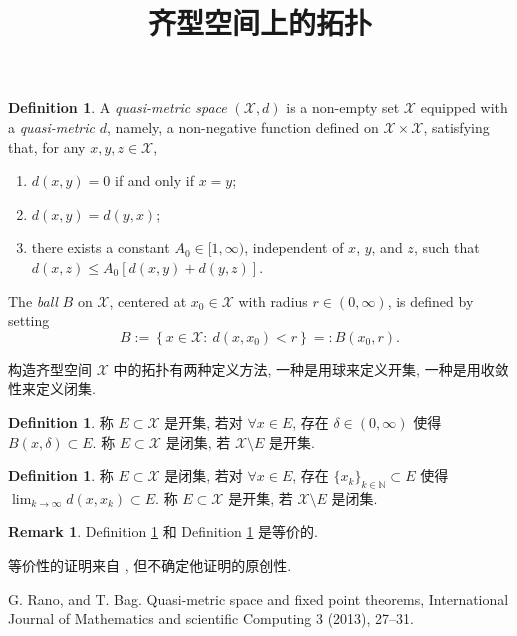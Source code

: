 \documentclass[a4paper,11pt]{article}
\title{齐型空间上的拓扑}
\theoremstyle{definition}
\newtheorem{remark}[theorem]{Remark}
\newtheorem{definition}[theorem]{Definition}
\begin{document}
\begin{CJK*}{UTF8}{gbsn}

\maketitle

\begin{definition} \label{10.21.1}
A \emph{quasi-metric space} $ (\mathcal{X}, d) $ is a non-empty set $ \mathcal{X} $ equipped with a \emph{quasi-metric} $ d $,
namely, a non-negative function defined on $ \mathcal{X} \times \mathcal{X} $, satisfying that, for any $ x, y, z \in \mathcal{X} $,
    \begin{enumerate}[{\rm(i)}]
        \item $ d(x, y) = 0 $ if and only if $ x = y $;
        \item $ d(x, y) = d(y, x) $;
        \item there exists a constant $ A_0 \in [1, \infty) $, independent of $ x $, $ y $,
            and $ z $, such that $ d(x, z) \leq A_0 [d(x, y) + d(y, z)] $.
    \end{enumerate}
\end{definition}

The \emph{ball} $ B $ on $ \mathcal{X} $, centered at $ x_0 \in \mathcal{X} $ with radius $ r \in (0, \infty) $, 
is defined by setting
$$
    B := \left\{x \in \mathcal{X} :\ d(x, x_0) < r \right\} =: B \left( x_0, r \right).
$$

构造齐型空间 $ \mathcal{X} $ 中的拓扑有两种定义方法, 一种是用球来定义开集, 一种是用收敛性来定义闭集.

\begin{definition} \label{def1}
    称 $ E \subset \mathcal{X} $ 是开集, 若对 $ \forall x \in E $, 
    存在 $ \delta \in (0, \infty) $ 使得 $ B(x, \delta) \subset E $.
    称 $ E \subset \mathcal{X} $ 是闭集, 若 $ \mathcal{X} \setminus E $ 是开集.
\end{definition}

\begin{definition} \label{def2}
    称 $ E \subset \mathcal{X} $ 是闭集, 若对 $ \forall x \in E $, 
    存在 $ \{x_k\}_{k \in \mathbb{N}} \subset E $ 使得 $ \lim_{k \to \infty} d(x, x_k) \subset E $.
    称 $ E \subset \mathcal{X} $ 是开集, 若 $ \mathcal{X} \setminus E $ 是闭集.
\end{definition}

\begin{remark}
    Definition \ref{def1} 和 Definition \ref{def2} 是等价的.
\end{remark}

等价性的证明来自 \cite[Theorem 3.1]{rb13}, 但不确定他证明的原创性.

\begin{thebibliography}{99}

      G. Rano, and T. Bag. Quasi-metric space and fixed point theorems, 
        International Journal of Mathematics and scientific Computing 3 (2013), 27--31.
    
\end{thebibliography}

\end{CJK*}
\end{document}
